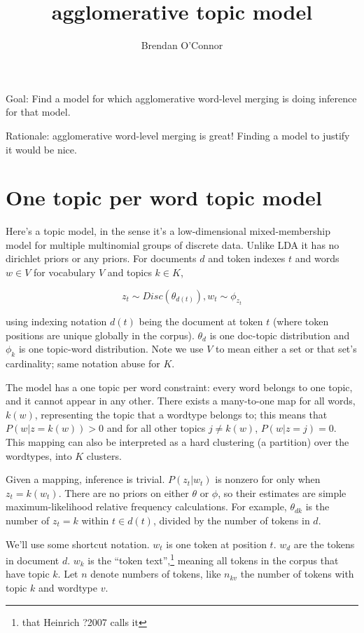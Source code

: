 \documentclass[11pt,letterpaper]{article}
\title{agglomerative topic model
}
\author{
Brendan O'Connor 
}
\theoremstyle{definition}
\begin{document}
\maketitle

Goal: Find a model for which agglomerative word-level merging is doing inference for that model.

Rationale: agglomerative word-level merging is great!  Finding a model to justify it would be nice.

\section{One topic per word topic model}

Here's a topic model, in the sense it's a low-dimensional mixed-membership model for multiple multinomial groups of discrete data.  Unlike LDA it has no dirichlet priors or any priors.  For documents $d$ and token indexes $t$ and words $w \in V$ for vocabulary $V$ and topics $k \in K$,

\[ z_t \sim Disc(\theta_{d(t)}), w_t \sim \phi_{z_t} \]

using indexing notation $d(t)$ being the document at token $t$ (where token positions are unique globally in the corpus).  $\theta_d$ is one doc-topic distribution and $\phi_k$ is one topic-word distribution.  Note we use $V$ to mean either a set or that set's cardinality; same notation abuse for $K$.

The model has a one topic per word constraint: every word belongs to one topic, and it cannot appear in any other.  There exists a many-to-one map for all words, $k(w)$, representing the topic that a wordtype belongs to; this means that $P(w|z=k(w))>0$ and for all other topics $j \neq k(w)$, $P(w|z=j)=0$.
This mapping can also be interpreted as a hard clustering (a partition) over the wordtypes, into $K$ clusters.

Given a mapping, inference is trivial.  $P(z_t|w_t)$ is nonzero for only when $z_t=k(w_t)$.  There are no priors on either $\theta$ or $\phi$, so their estimates are simple maximum-likelihood relative frequency calculations.  For example, $\theta_{dk}$ is the number of $z_t=k$ within $t \in d(t)$, divided by the number of tokens in $d$.

We'll use some shortcut notation.  $w_t$ is one token at position $t$.  $w_d$ are the tokens in document $d$.  $w_k$ is the ``token text'',\footnote{that Heinrich ?2007 calls it} meaning all tokens in the corpus that have topic $k$.  Let $n$ denote numbers of tokens, like $n_{kv}$ the number of tokens with topic $k$ and wordtype $v$.
\end{document}
